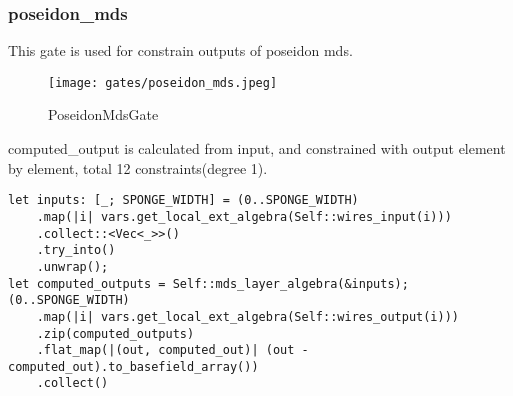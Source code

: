 \subsubsection{poseidon\_mds}

This gate is used for constrain outputs of poseidon mds.

\begin{figure}[!h]
    \centering
    \texttt{[image: gates/poseidon\_mds.jpeg]}
    \caption{PoseidonMdsGate}
    \label{fig:poseidon-mds}
\end{figure}

computed\_output is calculated from input, and constrained with output element by element, total 12 constraints(degree 1).
\begin{lstlisting}
let inputs: [_; SPONGE_WIDTH] = (0..SPONGE_WIDTH)
    .map(|i| vars.get_local_ext_algebra(Self::wires_input(i)))
    .collect::<Vec<_>>()
    .try_into()
    .unwrap();
let computed_outputs = Self::mds_layer_algebra(&inputs);
(0..SPONGE_WIDTH)
    .map(|i| vars.get_local_ext_algebra(Self::wires_output(i)))
    .zip(computed_outputs)
    .flat_map(|(out, computed_out)| (out - computed_out).to_basefield_array())
    .collect()
\end{lstlisting}